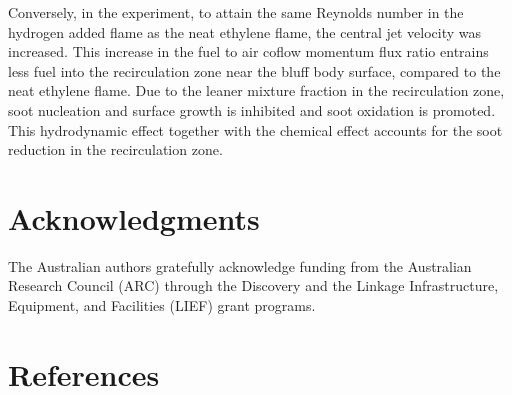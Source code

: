 \documentclass[review,3p,times]{elsarticle}
\begin{document}
Conversely, in the experiment, to attain the same Reynolds number in the hydrogen added flame as the neat ethylene flame, the central jet velocity was increased.  This increase in the fuel to air coflow momentum flux ratio entrains less fuel into the recirculation zone near the bluff body surface, compared to the neat ethylene flame.  Due to the leaner mixture fraction in the recirculation zone, soot nucleation and surface growth is inhibited and soot oxidation is promoted.  This hydrodynamic effect together with the chemical effect accounts for the soot reduction in the recirculation zone.    

\section*{Acknowledgments}

The Australian authors gratefully acknowledge funding from the Australian Research Council (ARC) through the Discovery and the Linkage Infrastructure, Equipment, and Facilities (LIEF) grant programs.


\section*{References}



\renewcommand{\thefigure}{\arabic{figure}}
\renewcommand{\thetable}{\arabic{table}}

\clearpage
\listoffigures
\end{document}
